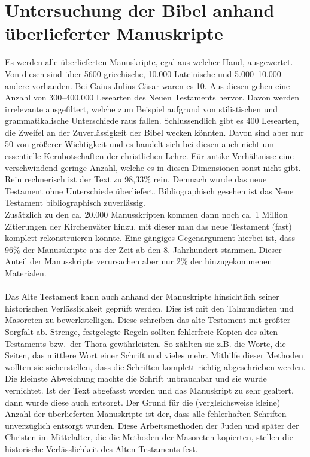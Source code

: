 \chapter{Untersuchung der Bibel anhand überlieferter Manuskripte}
Es werden alle überlieferten Manuskripte, egal aus welcher Hand, ausgewertet. Von diesen sind über 5600 griechische, 10.000 Lateinische und 5.000--10.000 andere vorhanden. Bei Gaius Julius Cäsar waren es 10.  Aus diesen gehen eine Anzahl von 300--400.000 Lesearten des Neuen Testaments hervor. Davon werden irrelevante ausgefiltert, welche zum Beispiel aufgrund von stilistischen und grammatikalische Unterschiede raus fallen. Schlussendlich gibt es 400 Lesearten, die Zweifel an der Zuverlässigkeit der Bibel wecken könnten. Davon sind aber nur 50 von größerer Wichtigkeit und es handelt sich bei diesen auch nicht um essentielle Kernbotschaften der christlichen Lehre. Für antike Verhältnisse eine verschwindend geringe Anzahl, welche es in diesen Dimensionen sonst nicht gibt. Rein rechnerisch ist der Text zu 98,33\% rein. Demnach wurde das neue Testament ohne Unterschiede überliefert. Bibliographisch gesehen ist das Neue Testament bibliographisch zuverlässig.
\\
Zusätzlich zu den ca. 20.000 Manusskripten kommen dann noch ca. 1 Million Zitierungen der Kirchenväter hinzu, mit dieser man das neue Testament (fast) komplett rekonstruieren könnte. Eine gängiges Gegenargument hierbei ist, dass 96\% der Manusskripte aus der Zeit ab den 8. Jahrhundert stammen. Dieser Anteil der Manusskripte verursachen aber nur 2\% der hinzugekommenen Materialen.
\\~\\
Das Alte Testament kann auch anhand der Manuskripte hinsichtlich seiner historischen Verlässlichkeit geprüft werden. Dies ist mit den Talmundisten und Masoreten zu bewerkstelligen. Diese schreiben das alte Testament mit größter Sorgfalt ab. Strenge, festgelegte Regeln sollten fehlerfreie Kopien des alten Testaments bzw.\ der Thora gewährleisten. So zählten sie z.B. die Worte, die Seiten, das mittlere Wort einer Schrift und vieles mehr. Mithilfe dieser Methoden wollten sie sicherstellen, dass die Schriften komplett richtig abgeschrieben werden. Die kleinste Abweichung machte die Schrift unbrauchbar und sie wurde vernichtet. Ist der Text abgefasst worden und das Manuskript zu sehr gealtert, dann wurde diese auch entsorgt. Der Grund für die (vergleichsweise kleine) Anzahl der überlieferten Manuskripte ist der, dass alle fehlerhaften Schriften unverzüglich entsorgt wurden. Diese Arbeitsmethoden der Juden und später der Christen im Mittelalter, die die Methoden der Masoreten kopierten, stellen die historische Verlässlichkeit des Alten Testaments fest.
